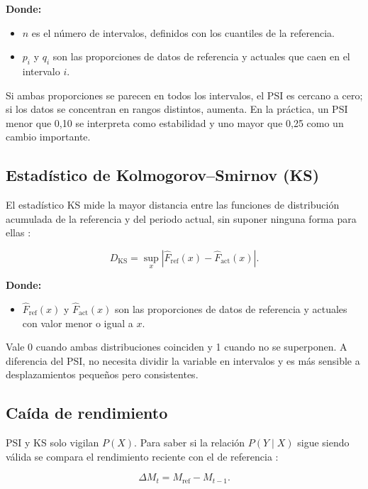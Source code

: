 \noindent\textbf{Donde:}
\begin{itemize}
    \item $n$ es el número de intervalos, definidos con los cuantiles de la referencia.
    \item $p_i$ y $q_i$ son las proporciones de datos de referencia y actuales que caen en el intervalo $i$.
\end{itemize}

Si ambas proporciones se parecen en todos los intervalos, el PSI es cercano a cero; si los
datos se concentran en rangos distintos, aumenta. En la práctica, un PSI menor que 0,10 se
interpreta como estabilidad y uno mayor que 0,25 como un cambio importante.

\subsection{Estadístico de Kolmogorov--Smirnov (KS)}

El estadístico KS mide la mayor distancia entre las funciones de distribución acumulada de
la referencia y del periodo actual, sin suponer ninguna forma para ellas
\cite{shakhovska2025severity}:

\begin{equation}
    D_{\text{KS}} = \sup_{x}
    \left|\hat{F}_{\text{ref}}(x) - \hat{F}_{\text{act}}(x)\right|.
    \label{eq:ks}
\end{equation}

\noindent\textbf{Donde:}
\begin{itemize}
    \item $\hat{F}_{\text{ref}}(x)$ y $\hat{F}_{\text{act}}(x)$ son las proporciones de datos de referencia y actuales con valor menor o igual a $x$.
\end{itemize}

Vale 0 cuando ambas distribuciones coinciden y 1 cuando no se superponen. A diferencia del
PSI, no necesita dividir la variable en intervalos y es más sensible a desplazamientos
pequeños pero consistentes.

\subsection{Caída de rendimiento}

PSI y KS solo vigilan $P(X)$. Para saber si la relación $P(Y \mid X)$ sigue siendo válida
se compara el rendimiento reciente con el de referencia \cite{gama2014survey}:

\begin{equation}
    \Delta M_t = M_{\text{ref}} - M_{t-1}.
    \label{eq:delta_metric}
\end{equation}

